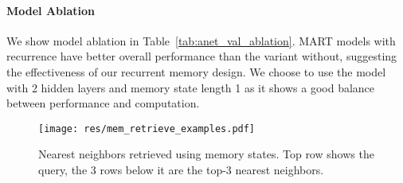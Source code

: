 \documentclass[11pt,a4paper]{article}
\begin{document}
\begin{table}[!t]
\centering
\small
\setlength{\tabcolsep}{4pt}
\caption{Model ablation on ActivityNet Captions \textit{ae-val} split. \textit{Re.} indicates whether sentence-level recurrence is used. \textit{mem. len.} indicates the length of the memory state. \textit{MART w/o re.} denotes a MART variant without recurrence. Top two scores are highlighted.}
\label{tab:anet_val_ablation}
\end{table}


\paragraph{Model Ablation}
We show model ablation in Table~\ref{tab:anet_val_ablation}. 
MART models with recurrence have better overall performance than the variant without, suggesting the effectiveness of our recurrent memory design.
We choose to use the model with 2 hidden layers and memory state length 1 as it shows a good balance between performance and computation.

\begin{figure}[!t]
  \centering
  \texttt{[image: res/mem\_retrieve\_examples.pdf]}
  \caption{Nearest neighbors retrieved using memory states. Top row shows the query, the 3 rows below it are the top-3 nearest neighbors.}
  \label{fig:mem_retrieve_example}
\end{figure} 
\end{document}
